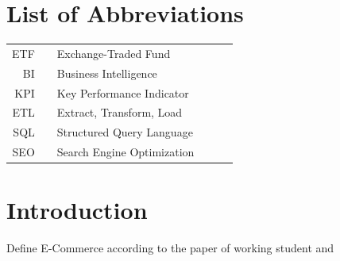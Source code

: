 \documentclass[11pt,a4paper]{article}
\begin{document}
\onehalfspacing
\setcounter{tocdepth}{4}
\parindent=0in
\parskip=8pt  %
\setlength{\belowcaptionskip}{-10pt}

\newpage
\tableofcontents

\newpage

\pagebreak
\listoffigures
\newpage
\section*{List of Abbreviations}

\begin{tabular}{rp{0.2cm}lp{1cm}p{7cm}l}
    ETF     & &  \small Exchange-Traded Fund   & &      \\
    BI     & &  \small Business Intelligence   & & \\
    KPI     & &  \small Key Performance Indicator   & & \\
    ETL     & &  \small Extract, Transform, Load   & & \\
    SQL     & &  \small Structured Query Language  & & \\
    SEO     & &  \small Search Engine Optimization  & & \\
\end{tabular}

\captionsetup{justification=justified,singlelinecheck=false}

\pagebreak
{}
\flushbottom
\doublespacing
\parindent=1cm

\section{Introduction}
Define E-Commerce according to the paper of working student and 
\end{document}
